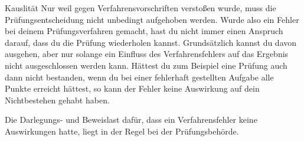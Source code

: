 \begin{artikel}{Kauslität}
Nur weil gegen Verfahrensvorschriften verstoßen wurde, muss die Prüfungsentscheidung nicht unbedingt aufgehoben werden. Wurde also ein Fehler bei deinem Prüfungsverfahren gemacht, hast du nicht immer einen Anspruch darauf, dass du die Prüfung wiederholen kannst. Grundsätzlich kannst du davon ausgehen, aber nur solange ein Einfluss des Verfahrensfehlers auf das Ergebnis nicht ausgeschlossen werden kann. Hättest du zum Beispiel eine Prüfung auch dann nicht bestanden, wenn du bei einer fehlerhaft gestellten Aufgabe alle Punkte erreicht hättest, so kann der Fehler keine Auswirkung auf dein Nichtbestehen gehabt haben.

Die Darlegungs- und Beweislast dafür, dass ein Verfahrensfehler keine Auswirkungen hatte, liegt in der Regel bei der Prüfungsbehörde.
\end{artikel}
